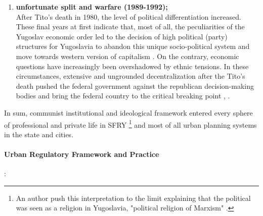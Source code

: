 \documentclass[11pt]{report}
\begin{document}
\begin{enumerate}
\item \textbf{unfortunate split and warfare (1989-1992);}
\\
After Tito's death in 1980, the level of political differentiation increased.
These final years at first indicate that, most of all, the peculiarities of the Yugoslav economic order led to the decision of high political (party) structures for Yugoslavia to abandon this unique socio-political system and  move towards western version of capitalism \href{}{\citealt{estrin_yugoslavia:_1991}}.
On the contrary, economic  questions  have  increasingly  been  overshadowed by  ethnic  tensions.
In these circumstances, extensive and ungrounded decentralization after the Tito's death pushed the federal government against the republican decision-making bodies and bring the federal country to the critical breaking point \href{}{\citealt{estrin_yugoslavia:_1991}}, \href{}{\citealt{vujosevic_post-socialist_2012}}.
\end{enumerate}

In sum, communist institutional and ideological framework entered every sphere of professional and private life in SFRY
\footnote{An author push this interpretation to the limit explaining that the political was seen as a religion in Yugoslavia, "political religion of Marxism" \href{}{\citealt{doytchinov_belgrade_2015}}.} and most of all urban planning systems in the state and cities. 

\paragraph{Urban Regulatory Framework and Practice}:
\end{document}
